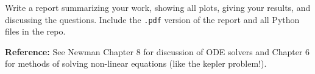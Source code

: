 \documentclass{article}
\begin{document}
Write a report summarizing your work, showing all plots, giving your results, and discussing the questions.  Include the \texttt{.pdf} version of the report and all Python files in the repo.

\vspace{1cm}

\textbf{Reference:} See Newman Chapter 8 for discussion of ODE solvers and Chapter 6 for methods of solving non-linear equations (like the kepler problem!).
\end{document}
